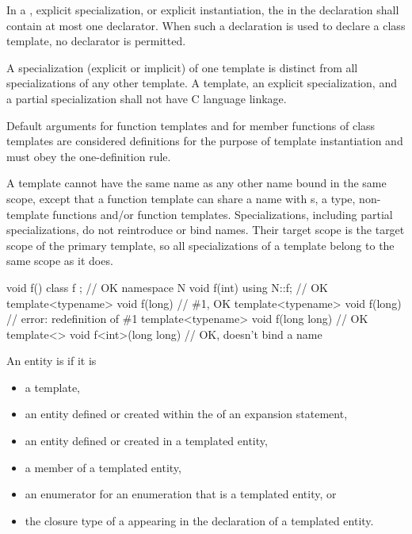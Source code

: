 \pnum
In a
,
explicit specialization, or explicit instantiation, the
in the declaration shall contain at most one declarator.
When such a declaration is used to declare a class template,
no declarator is permitted.

\pnum
{}%
A specialization (explicit or implicit) of one template is
distinct from all specializations of any other template.
A template, an explicit specialization, and a
partial specialization shall not have C language linkage.
\begin{note}
Default arguments for function templates and for member functions of
class templates are considered definitions for the purpose of template
instantiation and must obey the one-definition rule.
\end{note}

\pnum
\begin{note}
A template cannot have the same name as any other
name bound in the same scope, except
that a function template can share a name with s,
a type, non-template functions and/or function templates.
Specializations, including partial specializations,
do not reintroduce or bind names.
Their target scope is the target scope of the primary template,
so all specializations of a template belong to the same scope as it does.
\begin{example}
\begin{codeblock}
void f() {}
class f {};                                     // OK
namespace N {
  void f(int) {}
}
using N::f;                                     // OK
template<typename> void f(long) {}              // \#1, OK
template<typename> void f(long) {}              // error: redefinition of \#1
template<typename> void f(long long) {}         // OK
template<>         void f<int>(long long) {}    // OK, doesn't bind a name
\end{codeblock}
\end{example}
\end{note}

\pnum
{}%
An entity is 
if it is
\begin{itemize}
\item a template,
\item an entity defined or created
      within the 
      of an expansion statement,
\item an entity defined or created in a templated entity,
\item a member of a templated entity,
\item an enumerator for an enumeration that is a templated entity, or
\item the closure type of a 
      appearing in the declaration of a templated entity.
\end{itemize}

